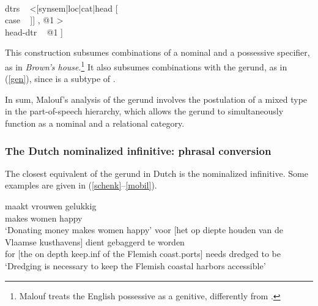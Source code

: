 \documentclass[output=paper]{langsci/langscibook}
\begin{document}
\begin{exe} 
\ex\label{gencx} 
\begin{avm} 
[\type{noun-poss-cx}                                      \\
 synsem|loc [cat|head ~ \type{noun}                       \\
             content ~ \type{nom-obj}]                    \\
 dtrs ~ <[synsem|loc|cat|head [                \\
                               case ~ ]] , @1 > \\
 head-dtr ~ @1 ] 
\end{avm}
\end{exe}
 
\noindent
This construction subsumes combinations of a nominal and a 
possessive specifier, as in \emph{Brown's house}.\footnote{Malouf treats 
the English possessive as a genitive, differently from \citet{SagWasow03}.}   
It also subsumes combinations with the gerund, as in (\ref{gen}), since 
 is a subtype of .  

In sum, Malouf's analysis of the gerund involves the postulation of a
mixed type in the part-of-speech hierarchy, which allows the gerund to simultaneously
function as a nominal and a relational category. 


\subsubsection{The Dutch nominalized infinitive: phrasal conversion } 


The closest equivalent of the gerund in Dutch is the nominalized infinitive. 
Some examples are given in (\ref{schenk}--\ref{mobil}). 

\begin{exe} 
\ex\label{schenk} 
 maakt vrouwen gelukkig  \\
       [money donate.{\sc inf}] makes women happy \\
\trans `Donating money makes women happy' 
\ex\label{mobil}   
\gll   voor [het op diepte houden van de Vlaamse kusthavens] dient gebaggerd te worden  \\  
       for [the on depth keep.{\sc inf} of the Flemish coast.ports] needs dredged to be \\
\trans `Dredging is necessary to keep the Flemish coastal harbors accessible'  
\end{exe} 
\end{document}
